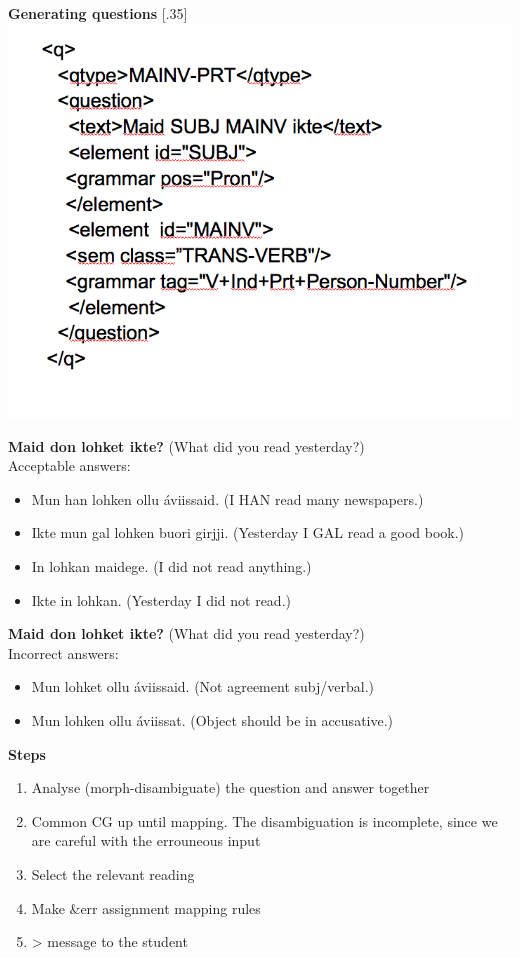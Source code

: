 \documentclass[landscape,norsk,11pt]{seminar}
\begin{document}
\begin{slide}
\newslide
\textbf{Generating questions}
\scalebox{.35}[.35]{\includegraphics{img/xml_question.png}}



\newslide
\textbf{Maid don lohket ikte?}
(What did you read yesterday?) \\
Acceptable answers:
\begin{itemize}
\item Mun han lohken ollu \'aviissaid. (I HAN read many newspapers.)
\item Ikte mun gal lohken buori girjji. (Yesterday I GAL read a good book.)
\item In lohkan maidege. (I did not read anything.)
\item Ikte in lohkan. (Yesterday I did not read.)
\end{itemize}

\newslide
\textbf{Maid don lohket ikte?}
(What did you read yesterday?) \\
Incorrect answers:
\begin{itemize}
\item Mun lohket ollu \'aviissaid. (Not agreement subj/verbal.)
\item Mun lohken ollu áviissat. (Object should be in accusative.)
\end{itemize}


\newslide
\textbf{Steps}

\begin{enumerate}
\item Analyse (morph-disambiguate) the question and answer together
\item Common CG up until mapping. The disambiguation is incomplete, since we are careful with the errouneous input
\item Select the relevant reading
\item Make \&err assignment mapping rules
\item > message to the student
\end{enumerate}


\end{slide}
\end{document}
